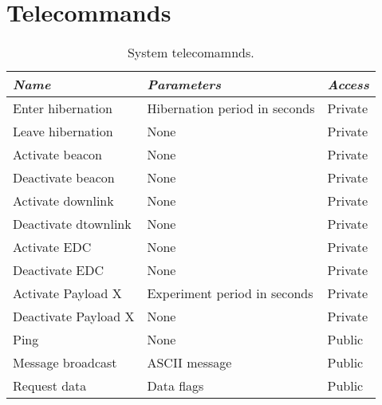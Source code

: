 \section{Telecommands}

\begin{table}[!h]
    \centering
    \begin{tabular}{lll}
        \toprule[1.5pt]
        \textit{Name}          & \textit{Parameters}           & \textit{Access} \\
        \midrule
        Enter hibernation      & Hibernation period in seconds & Private         \\
        Leave hibernation      & None                          & Private         \\
        Activate beacon        & None                          & Private         \\
        Deactivate beacon      & None                          & Private         \\
        Activate downlink      & None                          & Private         \\
        Deactivate dtownlink   & None                          & Private         \\
        Activate EDC           & None                          & Private         \\
        Deactivate EDC         & None                          & Private         \\
        Activate Payload X     & Experiment period in seconds  & Private         \\
        Deactivate Payload X   & None                          & Private         \\
        Ping                   & None                          & Public          \\
        Message broadcast      & ASCII message                 & Public          \\
        Request data           & Data flags                    & Public          \\
        \bottomrule[1.5pt]
    \end{tabular}
    \caption{System telecomamnds.}
    \label{tab:system-telecommands}
\end{table}
